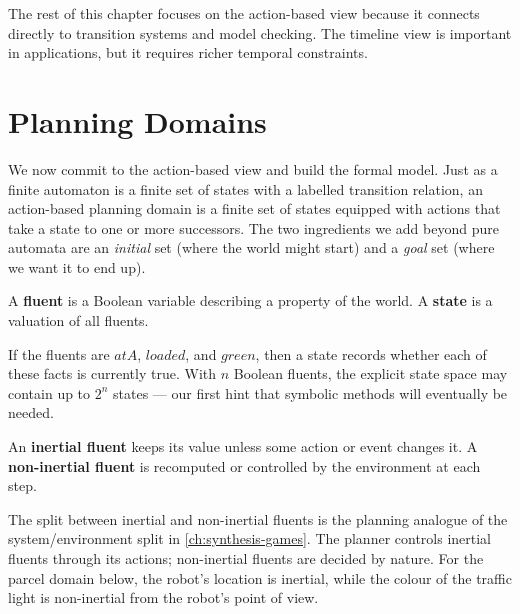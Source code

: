 The rest of this chapter focuses on the action-based view because it
connects directly to transition systems and model checking.  The
timeline view is important in applications, but it requires richer
temporal constraints.


\section{Planning Domains}
\label{sec:planning-domains}

We now commit to the action-based view and build the formal model.
Just as a finite automaton is a finite set of states with a labelled
transition relation, an action-based planning domain is a finite set
of states equipped with actions that take a state to one or more
successors.  The two ingredients we add beyond pure automata are an
\emph{initial} set (where the world might start) and a \emph{goal} set
(where we want it to end up).

\begin{definition}
\label{def:fluent-state}
A \textbf{fluent} is a Boolean variable describing a property of the
world.  A \textbf{state} is a valuation of all fluents.
\end{definition}

If the fluents are $\mathit{atA}$, $\mathit{loaded}$, and
$\mathit{green}$, then a state records whether each of these facts is
currently true.  With $n$ Boolean fluents, the explicit state space may
contain up to $2^n$ states --- our first hint that symbolic methods
will eventually be needed.

\begin{definition}
\label{def:inertial-fluents}
An \textbf{inertial fluent} keeps its value unless some action or event
changes it.  A \textbf{non-inertial fluent} is recomputed or controlled
by the environment at each step.
\end{definition}

The split between inertial and non-inertial fluents is the planning
analogue of the system/environment split in \cref{ch:synthesis-games}.
The planner controls inertial fluents through its actions; non-inertial
fluents are decided by nature.  For the parcel domain below, the
robot's location is inertial, while the colour of the traffic light is
non-inertial from the robot's point of view.

